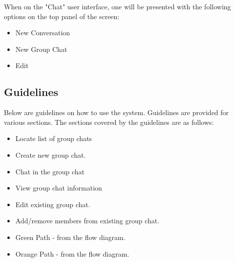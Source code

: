 \documentclass[11pt]{article}
\begin{document}
When on the "Chat" user interface, one will be presented with the following options on the top panel of the screen:
\begin{itemize}
\item New Conversation
\item New Group Chat
\item Edit
\end{itemize}

\subsection{Guidelines}
Below are guidelines on how to use the system. Guidelines are provided for various sections. The sections covered by the guidelines are as follows:
\begin{itemize}
\item Locate list of group chats
\item Create new group chat.
\item Chat in the group chat
\item View group chat information
\item Edit existing group chat.
\item Add/remove members from existing group chat.
\item Green Path - from the flow diagram.
\item Orange Path - from the flow diagram. 
\end{itemize}
\end{document}
